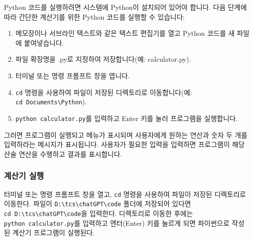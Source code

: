 \documentclass[
  letterpaper,
]{book}
\providecommand{\tightlist}{%
  \setlength{\itemsep}{0pt}\setlength{\parskip}{0pt}}\usepackage{longtable,booktabs,array}
\begin{document}
\begin{tcolorbox}[enhanced jigsaw, opacityback=0, opacitybacktitle=0.6, colback=white, rightrule=.15mm, coltitle=black, colframe=quarto-callout-note-color-frame, colbacktitle=quarto-callout-note-color!10!white, bottomrule=.15mm, bottomtitle=1mm, breakable, title=\textcolor{quarto-callout-note-color}{\faInfo}\hspace{0.5em}{how to run this python code}, titlerule=0mm, leftrule=.75mm, toptitle=1mm, left=2mm, arc=.35mm, toprule=.15mm]

Python 코드를 실행하려면 시스템에 Python이 설치되어 있어야 합니다. 다음
단계에 따라 간단한 계산기를 위한 Python 코드를 실행할 수 있습니다:

\begin{enumerate}
\def\labelenumi{\arabic{enumi}.}
\tightlist
\item
  메모장이나 서브라인 텍스트와 같은 텍스트 편집기를 열고 Python 코드를
  새 파일에 붙여넣습니다.
\item
  파일 확장명을 .py로 지정하여 저장합니다(예: calculator.py).
\item
  터미널 또는 명령 프롬프트 창을 엽니다.
\item
  \texttt{cd} 명령을 사용하여 파일이 저장된 디렉토리로 이동합니다(예:
  \texttt{cd\ Documents\textbackslash{}Python}).
\item
  \texttt{python\ calculator.py}를 입력하고 Enter 키를 눌러 프로그램을
  실행합니다.
\end{enumerate}

그러면 프로그램이 실행되고 메뉴가 표시되며 사용자에게 원하는 연산과 숫자
두 개를 입력하라는 메시지가 표시됩니다. 사용자가 필요한 입력을 입력하면
프로그램이 해당 산술 연산을 수행하고 결과를 표시합니다.

\end{tcolorbox}

\hypertarget{uxacc4uxc0b0uxae30-uxc2e4uxd589}{%
\subsubsection{계산기 실행}\label{uxacc4uxc0b0uxae30-uxc2e4uxd589}}

터미널 또는 명령 프롬프트 창을 열고, \texttt{cd} 명령을 사용하여 파일이
저장된 디렉토리로 이동한다. 파일이
\texttt{D:\textbackslash{}tcs\textbackslash{}chatGPT\textbackslash{}code}
폴더에 저장되어 있다면
\texttt{cd\ D:\textbackslash{}tcs\textbackslash{}chatGPT\textbackslash{}code}을
입력한다. 디렉토리로 이동한 후에는 \texttt{python\ calculator.py}를
입력하고 엔터(Enter) 키를 눌르게 되면 파이썬으로 작성된 계산기
프로그램이 실행된다.
\end{document}
